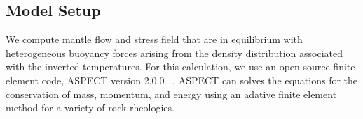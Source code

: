 \documentclass[draft,linenumbers]{agujournal2018}
\begin{document}
\subsection{Model Setup}
    
    We compute mantle flow and stress field that are in equilibrium with heterogeneous buoyancy forces arising from the density distribution associated with the inverted temperatures. For this calculation, we use an open-source finite element code, ASPECT version 2.0.0 ~\citep{heister_aspect_methods2,KHB12,aspect-doi-v2.0.0}. ASPECT can solves the equations for the conservation of mass, momentum, and energy using an adative finite element method for a variety of rock rheologies. 
    
\end{document}
